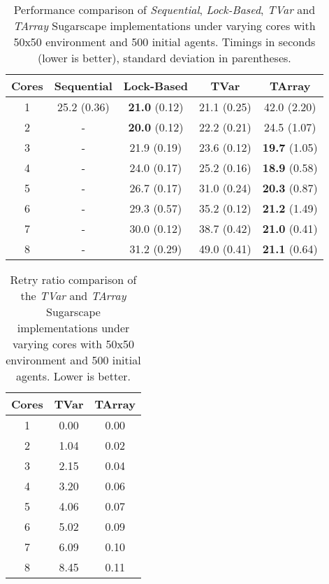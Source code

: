 \begin{table}
	\centering
  	\begin{tabular}{ c || c | c | c | c }
        Cores  & Sequential  & Lock-Based            & TVar         & TArray                \\ \hline \hline 
    		1      & 25.2 (0.36) & \textbf{21.0} (0.12)  & 21.1 (0.25)  & 42.0 (2.20)           \\ \hline
   		2      & -           & \textbf{20.0} (0.12)  & 22.2 (0.21)  & 24.5 (1.07)           \\ \hline
   		3      & -           & 21.9 (0.19)           & 23.6 (0.12)  & \textbf{19.7} (1.05)  \\ \hline
   		4      & -           & 24.0 (0.17)           & 25.2 (0.16)  & \textbf{18.9} (0.58)  \\ \hline
   		5      & -           & 26.7 (0.17)           & 31.0 (0.24)  & \textbf{20.3} (0.87)  \\ \hline
   		6      & -           & 29.3 (0.57)           & 35.2 (0.12)  & \textbf{21.2} (1.49)  \\ \hline
   		7      & -           & 30.0 (0.12)           & 38.7 (0.42)  & \textbf{21.0} (0.41)  \\ \hline
   		8      & -           & 31.2 (0.29)           & 49.0 (0.41)  & \textbf{21.1} (0.64)  \\ \hline \hline
   	\end{tabular}
 
  	\caption{Performance comparison of \textit{Sequential}, \textit{Lock-Based}, \textit{TVar} and \textit{TArray} Sugarscape implementations under varying cores with 50x50 environment and 500 initial agents. Timings in seconds (lower is better), standard deviation in parentheses.}
	\label{tab:sugarscape_varyingcores_constagents}
\end{table}

\begin{table}
	\centering
  	\begin{tabular}{ c || c | c }
        Cores & TVar  & TArray  \\ \hline \hline 
    		1     & 0.00  & 0.00    \\ \hline
   		2     & 1.04  & 0.02    \\ \hline
   		3     & 2.15  & 0.04    \\ \hline
   		4     & 3.20  & 0.06    \\ \hline
   		5     & 4.06  & 0.07    \\ \hline
   		6     & 5.02  & 0.09    \\ \hline
   		7     & 6.09  & 0.10    \\ \hline
   		8     & 8.45  & 0.11    \\ \hline \hline
   	\end{tabular}
 
  	\caption{Retry ratio comparison of the \textit{TVar} and \textit{TArray} Sugarscape implementations under varying cores with 50x50 environment and 500 initial agents. Lower is better.}
	\label{tab:sugarscape_retry_ratios}
\end{table}

